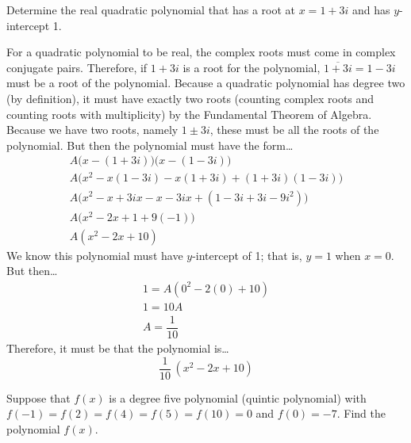 \documentclass[11pt,letterpaper]{article}
\begin{document}
\newpage



 Determine the real quadratic polynomial that has a root at $x= 1 + 3i$ and has $y$-intercept 1. \pspace

\sol For a quadratic polynomial to be real, the complex roots must come in complex conjugate pairs. Therefore, if $1 + 3i$ is a root for the polynomial, $\overline{1 + 3i}= 1 - 3i$ must be a root of the polynomial. Because a quadratic polynomial has degree two (by definition), it must have exactly two roots (counting complex roots and counting roots with multiplicity) by the Fundamental Theorem of Algebra. Because we have two roots, namely $1 \pm 3i$, these must be all the roots of the polynomial. But then the polynomial must have the form\dots
	\[
	\begin{gathered}
	A \big(x - (1 + 3i) \big) \big(x - (1 - 3i) \big) \\[0.3cm]
	A (x^2 - x(1 - 3i) - x(1 + 3i) + (1 + 3i)(1 - 3i) \big) \\[0.3cm]
	A \big(x^2 - x + 3ix - x - 3ix + (1 - 3i + 3i - 9i^2) \big) \\[0.3cm]
	A \big(x^2 - 2x + 1 + 9(-1) \big) \\[0.3cm]
	A(x^2 - 2x + 10) 
	\end{gathered}
	\]  \pspace
We know this polynomial must have $y$-intercept of 1; that is, $y= 1$ when $x= 0$. But then\dots
	\[
	\begin{gathered}
	1= A(0^2 - 2(0) + 10) \\[0.3cm]
	1= 10A \\[0.3cm]
	A= \dfrac{1}{10}
	\end{gathered}
	\] \pspace
Therefore, it must be that the polynomial is\dots
	\[
	\dfrac{1}{10}\, (x^2 - 2x + 10)
	\]



\newpage



 Suppose that $f(x)$ is a degree five polynomial (quintic polynomial) with $f(-1)= f(2)= f(4)= f(5)= f(10)= 0$ and $f(0)= -7$. Find the polynomial $f(x)$. \pspace
\end{document}
